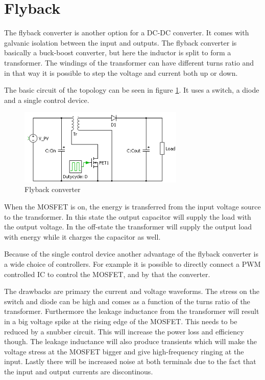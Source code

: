 \section{Flyback}

The flyback converter is another option for a DC-DC converter. It comes with galvanic isolation between the input and outputs. The flyback converter is basically a buck-boost converter, but here the inductor is split to form a transformer. The windings of the transformer can have different turns ratio and in that way it is possible to step the voltage and current both up or down. 

The basic circuit of the topology can be seen in figure \ref{Flyback_SCHEMATIC}. It uses a switch, a diode and a single control device.    

\begin{figure}[htbp]
	\begin{center}
	\includegraphics[width=0.7\textwidth]{../Pictures/flyback_schem.png}
	\caption{Flyback converter}
	\label{Flyback_SCHEMATIC}
	\end{center}
\end{figure}

When the MOSFET is on, the energy is transferred from the input voltage source to the transformer. In this state the output capacitor will supply the load with the output voltage. In the off-state the transformer will supply the output load with energy while it charges the capacitor as well. \cite{flyback}

Because of the single control device another advantage of the flyback converter is a wide choice of controllers. For example it is possible to directly connect a PWM controlled IC to control the MOSFET, and by that the converter. 

The drawbacks are primary the current and voltage waveforms. The stress on the switch and diode can be high and comes as a function of the turns ratio of the transformer. Furthermore the leakage inductance from the transformer will result in a big voltage spike at the rising edge of the MOSFET. This needs to be reduced by a snubber circuit. This will increase the power loss and efficiency though. The leakage inductance will also produce transients which will make the voltage stress at the MOSFET bigger and give high-frequency ringing at the input. Lastly there will be increased noise at both terminals due to the fact that the input and output currents are discontinous.\cite{under the hood}
